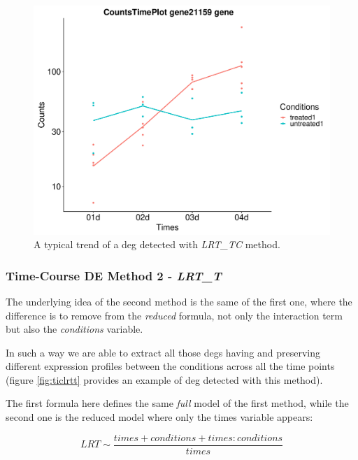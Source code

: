 \begin{figure}[H]
\centering
\includegraphics[width=\textwidth, keepaspectratio]{img/ticorser/de/trends/trend_LRT.pdf}
\caption[\gls{tic} LRT\_TC trend]{A typical trend of a \gls{deg} detected with \textit{LRT\_TC} method.}
\label{fig:ticlrttc}
\end{figure}

\subsubsection{Time-Course DE Method 2 - \textit{LRT\_T}}
The underlying idea of the second method is the same of the first one, where the difference is to remove from the \textit{reduced} formula, not only the interaction term but also the \textit{conditions} variable.

In such a way we are able to extract all those \glspl{deg} having and preserving different expression profiles between the conditions across all the time points (figure \ref{fig:ticlrtt} provides an example of \gls{deg} detected with this method).

The first formula here defines the same \textit{full} model of the first method, while the second one is the reduced model where only the times variable appears:

\[LRT \sim \frac{times+conditions+times:conditions}{times}\]

